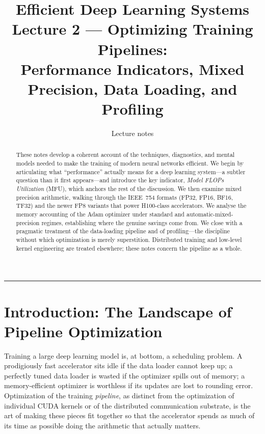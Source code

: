 \documentclass[11pt,a4paper]{article}
\title{\textbf{Efficient Deep Learning Systems} \\[0.3em]
       \large Lecture 2 --- Optimizing Training Pipelines: \\
       Performance Indicators, Mixed Precision, Data Loading, and Profiling}
\author{Lecture notes}
\date{}
\theoremstyle{definition}
\theoremstyle{remark}
\theoremstyle{plain}
\begin{document}
\sloppy
\maketitle


\begin{abstract}
\noindent
These notes develop a coherent account of the techniques, diagnostics,
and mental models needed to make the training of modern neural networks
efficient. We begin by articulating what ``performance'' actually means
for a deep learning system---a subtler question than it first
appears---and introduce the key indicator, \emph{Model FLOPs
Utilization} (MFU), which anchors the rest of the discussion. We then
examine mixed precision arithmetic, walking through the IEEE~754
formats (FP32, FP16, BF16, TF32) and the newer FP8 variants that power
H100-class accelerators. We analyse the memory accounting of the Adam
optimizer under standard and automatic-mixed-precision regimes,
establishing where the genuine savings come from. We close with a pragmatic treatment of the data-loading
pipeline and of profiling---the discipline without which optimization is
merely superstition. Distributed training and low-level kernel
engineering are treated elsewhere; these notes concern the pipeline as a
whole.
\end{abstract}

\tableofcontents
\bigskip
\hrule
\bigskip

\section{Introduction: The Landscape of Pipeline Optimization}

Training a large deep learning model is, at bottom, a scheduling
problem. A prodigiously fast accelerator sits idle if the data loader
cannot keep up; a perfectly tuned data loader is wasted if the optimizer
spills out of memory; a memory-efficient optimizer is worthless if its
updates are lost to rounding error. Optimization of the training
\emph{pipeline}, as distinct from the optimization of individual CUDA
kernels or of the distributed communication substrate, is the art of
making these pieces fit together so that the accelerator spends as much
of its time as possible doing the arithmetic that actually matters.
\end{document}
